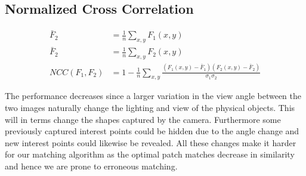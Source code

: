 \documentclass[11pt,a4paper]{article}
\begin{document}
\subsection{Normalized Cross Correlation}
\begin{align}
    \bar{F}_2 &= \frac{1}{n}\sum_{x,y} F_1(x,y) \\
    \bar{F}_2 &= \frac{1}{n}\sum_{x,y} F_2(x,y) \\
    NCC \left( F_1,F_2 \right) &= 1 - \frac{1}{n}
    \sum_{x,y}\frac{\left(F_1(x,y)-\bar{F}_1\right) \left( F_2(x,y)-\bar{F}_2
\right)}{\sigma_1 \sigma_2}
\end{align}

The performance decreases since a larger variation in the view angle between
the two images naturally change the lighting and view of the physical objects.
This will in terms change the shapes captured by the camera. Furthermore some
previously captured interest points could be hidden due to the angle change
and new interest points could likewise be revealed. All these changes make it
harder for our matching algorithm as the optimal patch matches decrease in
similarity and hence we are prone to erroneous matching.
\end{document}
